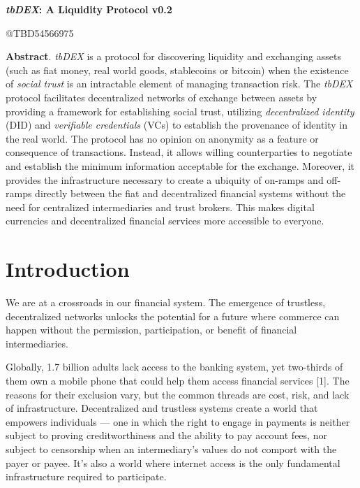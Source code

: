 \documentclass[11pt]{article}
\begin{document}
\begin{center}
{\LARGE \textbf{\textit{tbDEX}: A Liquidity Protocol v0.2}}
\end{center}


\vspace{1\baselineskip}
\begin{center}
{\large \textcolor[HTML]{999999}{@TBD54566975}}
\end{center}


\vspace{2\baselineskip}
\textbf{Abstract}. \textit{tbDEX} is a protocol for discovering liquidity and exchanging assets (such as fiat money, real world goods, stablecoins or bitcoin)\textcolor[HTML]{202124}{ }when the existence of \textit{social trust} is an intractable element of managing transaction risk. The \textit{tbDEX} protocol facilitates decentralized networks of exchange between assets by providing a framework for establishing social trust, utilizing \textit{decentralized identity} (DID) and \textit{verifiable credentials }(VCs) to establish the provenance of identity in the real world. The protocol has no opinion on anonymity as a feature or consequence of transactions. Instead, it allows willing counterparties to negotiate and establish the minimum information acceptable for the exchange. Moreover, it provides the infrastructure necessary to create a ubiquity of on-ramps and off-ramps directly between the fiat and decentralized financial systems without the need for centralized intermediaries and trust brokers. This makes digital currencies and decentralized financial services more accessible to everyone.

\vspace{1\baselineskip}
\section{Introduction}

\vspace{1\baselineskip}
We are at a crossroads in our financial system. The emergence of trustless, decentralized networks unlocks the potential for a future where commerce can happen without the permission, participation, or benefit of financial intermediaries. 

\vspace{1\baselineskip}
Globally, 1.7 billion adults lack access to the banking system, yet two-thirds of them own a mobile phone that could help them access financial services [1]. The reasons for their exclusion vary, but the common threads are cost, risk, and lack of infrastructure. Decentralized and trustless systems create a world that empowers individuals \textcolor[HTML]{202124}{— one in which }the right to engage in payments is neither subject to proving creditworthiness and the ability to pay account fees, nor subject to censorship when an intermediary’s values do not comport with the payer or payee. It’s also a world where internet access is the only fundamental infrastructure required to participate.\ \ 
\end{document}
